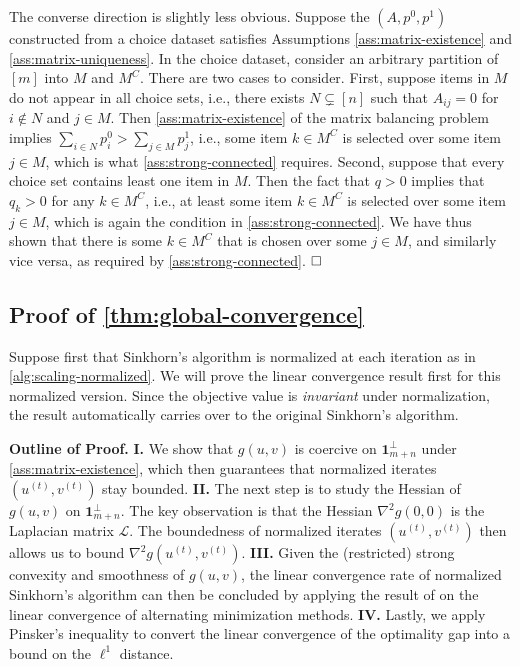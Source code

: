 The converse direction is slightly less obvious. Suppose the $(A, p^0, p^1)$ constructed from a choice dataset satisfies Assumptions \ref{ass:matrix-existence} and \ref{ass:matrix-uniqueness}. In the choice dataset, consider an arbitrary partition of $[m]$ into $M$ and $M^C$. There are two cases to consider. First, suppose items in $M$ do not appear in all choice sets, i.e., there exists $N \subsetneq [n]$ such that $A_{ij}=0$ for $i\notin N$ and $j\in M$. Then \cref{ass:matrix-existence} of the matrix balancing problem implies $\sum_{i\in N}p^0_i > \sum_{j\in M}p^1_j$, i.e., some item $k \in M^C$ is selected over some item $j\in M$, which is what \cref{ass:strong-connected} requires. Second, suppose that every choice set contains least one item in $M$. Then the fact that $q>0$ implies that $q_k>0$ for any $k\in M^C$, i.e., at least some item $k\in M^C$ is selected over some item $j\in M$, which is again the condition in \cref{ass:strong-connected}. We have thus shown that there is some $k\in M^C$ that is chosen over some $j\in M$, and similarly vice versa, as required by \cref{ass:strong-connected}.
$\hfill \square$

 \subsection{Proof of \cref{thm:global-convergence}}
Suppose first that Sinkhorn's algorithm is normalized at each iteration as in \cref{alg:scaling-normalized}. We will prove the linear convergence result first for this normalized version. Since the objective value is \emph{invariant} under normalization, the result automatically carries over to the original Sinkhorn's algorithm.

 \textbf{Outline of Proof.} \textbf{I.} We show that $g(u,v)$ is coercive on $\mathbf{1}_{m+n}^\perp$ under \cref{ass:matrix-existence}, which then guarantees that normalized iterates $(u^{(t)},v^{(t)})$ stay bounded. \textbf{II.} The next step is to study the Hessian of $g(u,v)$ on $\mathbf{1}_{m+n}^\perp$. The key observation is that the Hessian $\nabla^2 g(0,0)$ is the Laplacian matrix $\mathcal{L}$. The boundedness of normalized iterates $(u^{(t)},v^{(t)})$ then allows us to bound $\nabla^2g(u^{(t)},v^{(t)})$. \textbf{III.} Given the (restricted) strong convexity and smoothness of $g(u,v)$, the linear convergence rate of normalized Sinkhorn's algorithm can then be concluded by applying the result of \citet{beck2013convergence} on the linear convergence of alternating minimization methods. \textbf{IV.} Lastly, we apply Pinsker's inequality to convert the linear convergence of the optimality gap into a bound on the $\ell^1$ distance.

